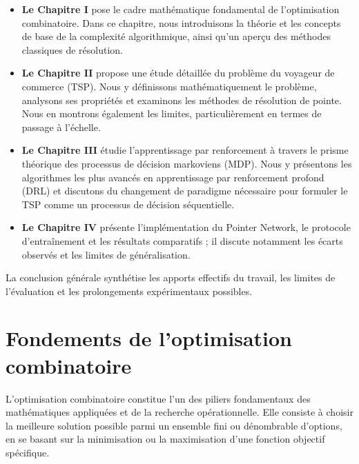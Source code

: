 \documentclass[12pt, a4paper, twoside, openright]{book}
\begin{document}
	\begin{itemize}
		\item \textbf{Le Chapitre I} pose le cadre mathématique fondamental de l'optimisation combinatoire. Dans ce chapitre, nous introduisons la théorie et les concepts de base de la complexité algorithmique, ainsi qu'un aperçu des méthodes classiques de résolution.
		
		\item \textbf{Le Chapitre II} propose une étude détaillée du problème du voyageur de commerce (TSP). Nous y définissons mathématiquement le problème, analysons ses propriétés et examinons les méthodes de résolution de pointe. Nous en montrons également les limites, particulièrement en termes de passage à l'échelle.
		
		\item \textbf{Le Chapitre III} étudie l'apprentissage par renforcement à travers le prisme théorique des processus de décision markoviens (MDP). Nous y présentons les algorithmes les plus avancés en apprentissage par renforcement profond (DRL) et discutons du changement de paradigme nécessaire pour formuler le TSP comme un processus de décision séquentielle.
		
		\item \textbf{Le Chapitre IV} présente l'implémentation du Pointer Network, le protocole d'entraînement et les résultats comparatifs ; il discute notamment les écarts observés et les limites de généralisation.
	\end{itemize}
	
	La conclusion générale synthétise les apports effectifs du travail, les limites de l'évaluation et les prolongements expérimentaux possibles.
	
	\chapter[Fondements de l'optimisation combinatoire]{Fondements de l'optimisation \\ combinatoire}
	\label{chap:fondements}
	
	L'optimisation combinatoire constitue l'un des piliers fondamentaux des mathématiques appliquées et de la recherche opérationnelle. Elle consiste à choisir la meilleure solution possible parmi un ensemble fini ou dénombrable d'options, en se basant sur la minimisation ou la maximisation d'une fonction objectif spécifique. 
	
\end{document}
